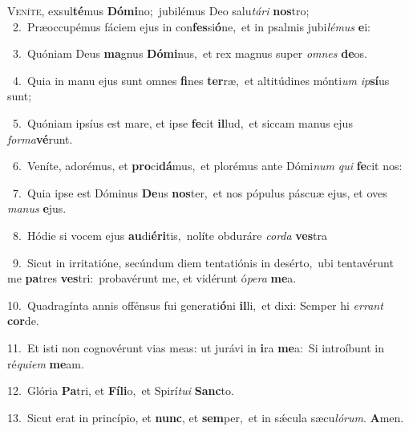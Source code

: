 \lettrine{\initial\textcolor{\initialcolor}{V}}{eníte,} exsul\-\textbf{té}\-mus \textbf{Dó}\-\textbf{mi}no;~\star jubilémus Deo salu\-\textit{tá}\-\textit{ri} \textbf{nos}\-tro;\\
{\numbfont\textcolor{\numbcolor}{~2.}}~Præoccupémus fáciem ejus in con\-\textbf{fes}\-si\-\textbf{ó}\-ne,~\star et in psalmis jubi\-\textit{lé}\-\textit{mus} \textbf{e}\-i:\par
{\numbfont\textcolor{\numbcolor}{~3.}}~Quóniam Deus \textbf{ma}\-gnus \textbf{Dó}\-\textbf{mi}nus,~\star et rex magnus super \textit{om}\-\textit{nes} \textbf{de}\-os.\par
{\numbfont\textcolor{\numbcolor}{~4.}}~Quia in manu ejus sunt omnes \textbf{fi}\-nes \textbf{ter}\-ræ,~\star et altitúdines mónti\textit{um} \textit{ip}\-\textbf{sí}us sunt;\par
{\numbfont\textcolor{\numbcolor}{~5.}}~Quóniam ipsíus est mare, et ipse \textbf{fe}\-cit \textbf{il}\-lud,~\star et siccam manus ejus \textit{for}\-\textit{ma}\textbf{vé}runt.\par
{\numbfont\textcolor{\numbcolor}{~6.}}~Veníte, adorémus, et \textbf{pro}\-ci\-\textbf{dá}\-mus,~\star et plorémus ante Dómi\textit{num} \textit{qui} \textbf{fe}\-cit nos:\par
{\numbfont\textcolor{\numbcolor}{~7.}}~Quia ipse est Dóminus \textbf{De}\-us \textbf{nos}\-ter,~\star et nos pópulus páscuæ ejus, et oves \textit{ma}\-\textit{nus} \textbf{e}\-jus.\par
{\numbfont\textcolor{\numbcolor}{~8.}}~Hódie si vocem ejus \textbf{au}\-di\-\textbf{é}\-\textbf{ri}tis,~\star nolíte obduráre \textit{cor}\-\textit{da} \textbf{ves}\-tra\par
{\numbfont\textcolor{\numbcolor}{~9.}}~Sicut in irritatióne, secúndum diem tentatiónis in desérto,~\dagger ubi tentavérunt me \textbf{pa}\-tres \textbf{ves}\-tri:~\star probavérunt me, et vidérunt ó\-\textit{pe}\-\textit{ra} \textbf{me}\-a.\par
{\numbfont\textcolor{\numbcolor}{10.}}~Quadragínta annis offénsus fui generati\-\textbf{ó}\-ni \textbf{il}\-li,~\star et dixi: Semper hi \textit{er}\-\textit{rant} \textbf{cor}\-de.\par
{\numbfont\textcolor{\numbcolor}{11.}}~Et isti non cognovérunt vias meas: ut jurávi in \textbf{i}\-ra \textbf{me}\-a:~\star Si introíbunt in ré\-\textit{qui}\-\textit{em} \textbf{me}\-am.\par
{\numbfont\textcolor{\numbcolor}{12.}}~Glória \textbf{Pa}\-tri, et \textbf{Fí}\-\textbf{li}o,~\star et Spirí\-\textit{tu}\-\textit{i} \textbf{Sanc}\-to.\par
{\numbfont\textcolor{\numbcolor}{13.}}~Sicut erat in princípio, et \textbf{nunc}\-, et \textbf{sem}\-per,~\star et in sǽcula sæcu\-\textit{ló}\-\textit{rum}. \textbf{A}\-men.\par
